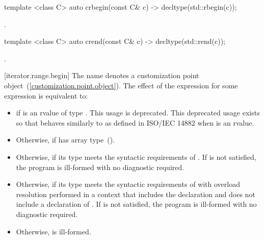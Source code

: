 {%
\begin{itemdecl}
template <class C> auto crbegin(const C& c) -> decltype(std::rbegin(c));
\end{itemdecl}
\begin{itemdescr}
\pnum \returns {}.
\end{itemdescr}

%
\begin{itemdecl}
template <class C> auto crend(const C& c) -> decltype(std::rend(c));
\end{itemdecl}
\begin{itemdescr}
\pnum \returns {}.
\end{itemdescr}
} %

{\color{newclr}
[iterator.range.begin]{}
\pnum
The name  denotes a customization point
 object~(\ref{customization.point.object}). The effect of the expression
 for some expression  is equivalent to:

\begin{itemize}
\item
   if  is an rvalue of
  type . This usage is deprecated.
  \enternote This deprecated usage exists so that
   behaves similarly to 
  as defined in ISO/IEC 14882 when  is an rvalue. \exitnote

\item
  Otherwise,  if  has array
  type~().

\item
  Otherwise,  if its type  meets the
  syntactic requirements of . If
   is not satisfied, the program is ill-formed
  with no diagnostic required.

\item
  Otherwise,  if its type  meets the
  syntactic requirements of  with overload
  resolution performed in a context that includes the declaration
   and does not include
  a declaration of . If 
  is not satisfied, the program is ill-formed with no diagnostic
  required.

\item
  Otherwise,  is ill-formed.
\end{itemize}

}
